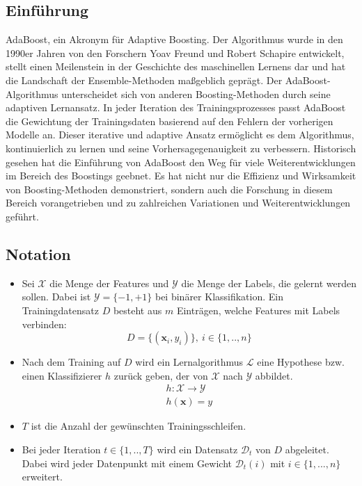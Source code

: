 \documentclass[11pt,a4paper,oneside]{scrartcl}
\begin{document}
\subsection*{Einführung}
AdaBoost, ein Akronym für \glqq Adaptive Boosting\grqq. Der Algorithmus wurde in den 1990er Jahren von
den Forschern Yoav Freund und Robert Schapire entwickelt, stellt einen Meilenstein in der Geschichte
des maschinellen Lernens dar und hat die Landschaft der Ensemble-Methoden maßgeblich geprägt.
Der AdaBoost-Algorithmus unterscheidet sich von anderen Boosting-Methoden durch seine adaptiven Lernansatz.
In jeder Iteration des Trainingsprozesses passt AdaBoost die Gewichtung der Trainingsdaten basierend auf den
Fehlern der vorherigen Modelle an. Dieser iterative und adaptive Ansatz ermöglicht es dem Algorithmus,
kontinuierlich zu lernen und seine Vorhersagegenauigkeit zu verbessern.
Historisch gesehen hat die Einführung von AdaBoost den Weg für viele Weiterentwicklungen im Bereich des
Boostings geebnet. Es hat nicht nur die Effizienz und Wirksamkeit von Boosting-Methoden demonstriert,
sondern auch die Forschung in diesem Bereich vorangetrieben und zu zahlreichen Variationen und
Weiterentwicklungen geführt. \cite{WuKumar2009}

\subsection*{Notation}
\begin{itemize}
    \item
          Sei $\mathcal{X}$ die Menge der Features und $\mathcal{Y}$ die Menge der Labels, die gelernt werden sollen.
          Dabei ist $\mathcal{Y}=\{-1, +1\}$ bei binärer Klassifikation. Ein Trainingdatensatz $D$ besteht aus $m$ Einträgen,
          welche Features mit Labels verbinden:
          $$
              D=\{(\boldsymbol{x}_i, y_i)\},~i\in\{1, .., n\}
          $$
    \item Nach dem Training auf $D$ wird ein Lernalgorithmus $\mathcal{L}$ eine Hypothese bzw. einen Klassifizierer
          $h$ zurück geben, der von $\mathcal{X}$ nach $\mathcal{Y}$ abbildet.
          \begin{align*}
              h:\mathcal{X} \rightarrow \mathcal{Y} \\
              h(\boldsymbol{x}) = y
          \end{align*}
    \item $T$ ist die Anzahl der gewünschten Trainingsschleifen.
    \item Bei jeder Iteration $t\in\{1, .., T\}$ wird ein Datensatz $\mathcal{D}_t$ von $D$ abgeleitet. Dabei wird
          jeder Datenpunkt mit einem Gewicht $\mathcal{D}_t(i)$ mit $i\in\{1, ..., n\}$ erweitert.
\end{itemize}
\end{document}
